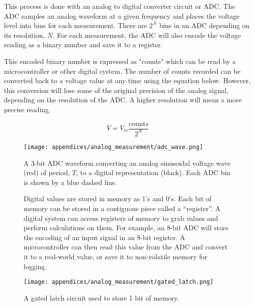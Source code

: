This process is done with an analog to digital converter circuit or ADC. 
The ADC samples an analog waveform at a given frequency and places the voltage level into bins for each measurement.
There are $2^N$ bins in an ADC depending on its resolution, $N$.
For each measurement, the ADC will also encode the voltage reading as a binary number and save it to a register.

This encoded binary number is expressed as "counts" which can be read by a microcontroller or other digital system.
The number of counts recorded can be converted back to a voltage value at any time using the equation below.
However, this conversion will lose some of the original precision of the analog signal, depending on the resolution of the ADC.
A higher resolution will mean a more precise reading.

\begin{equation*}
    V = V_{cc} \frac{\text{counts}}{2^N}
\end{equation*}

\begin{figure}[h!]
    \caption[Analog to digital converter waveform]{A 3-bit ADC waveform converting an analog sinusoidal voltage wave (red) of period, $T$, to a digital representation (black).
    Each ADC bin is shown by a blue dashed line.}
    \centering
    \texttt{[image: appendices/analog\_measurement/adc\_wave.png]}
\end{figure}

\begin{figure}
    \centering
    \begin{fitbox}[frametitle=Aside: Registers]
        Digital values are stored in memory as 1's and 0's.
        Each bit of memory can be stored in a contiguous piece called a ``register''.
        A digital system can access registers of memory to grab values and perform calculations on them.
        For example, an 8-bit ADC will store the encoding of an input signal in an 8-bit register.
        A microcontroller can then read this value from the ADC and convert it to a real-world value, or save it to non-volatile memory for logging.

        \texttt{[image: appendices/analog\_measurement/gated\_latch.png]}
        \caption{A gated latch circuit used to store 1 bit of memory.}
    \end{fitbox}
\end{figure}